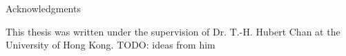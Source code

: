 \thispagestyle{empty}

\vspace*{20mm}

\begin{center}
{ Acknowledgments}
\end{center}

\vspace{10mm}

This thesis was written under the supervision of Dr. T.-H. Hubert Chan at the University of Hong Kong.
TODO: ideas from him


\cleardoublepage{}
